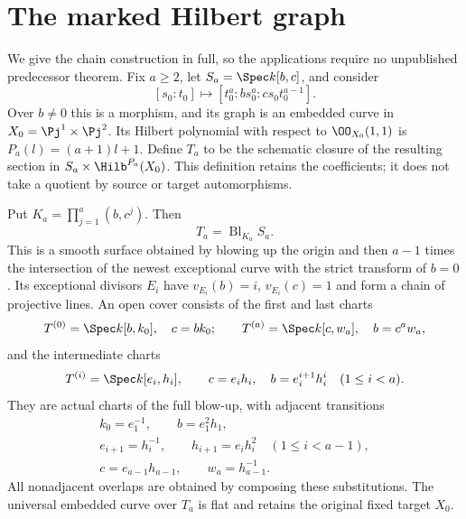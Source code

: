 \section{The marked Hilbert graph}
\label{sec:chain-v171}
We give the chain construction in full, so the applications require no
unpublished predecessor theorem. Fix $a\geq2$, let
$S_a=\Spec k[b,c]$, and consider
\begin{equation}\label{eq:marked-map-v171}
 [s_0:t_0]\longmapsto[t_0^a:b s_0^a:cs_0t_0^{a-1}].
\end{equation}
Over $b\ne0$ this is a morphism, and its graph is an embedded curve in
$X_0=\Pj^1\times\Pj^2$. Its Hilbert polynomial with respect to
$\OO_{X_0}(1,1)$ is $P_a(l)=(a+1)l+1$. Define $T_a$ to be the
schematic closure of the resulting section in
$S_a\times\Hilb^{P_a}(X_0)$. This definition retains the coefficients;
it does not take a quotient by source or target automorphisms.

\begin{theorem}
\label{thm:chain-v171}
Put $K_a=\prod_{j=1}^a(b,c^j)$. Then
\begin{equation}\label{eq:chain-blowup-v171}
 T_a=\operatorname{Bl}_{K_a}S_a.
\end{equation}
This is a smooth surface obtained by blowing up the origin and then
$a-1$ times the intersection of the newest exceptional curve with
the strict transform of $b=0$. Its exceptional divisors $E_i$ have
$v_{E_i}(b)=i$, $v_{E_i}(c)=1$ and form a chain of projective lines.
An open cover consists of the first and last charts
\[
 T^{(0)}=\Spec k[b,k_0],\quad c=bk_0;
 \qquad T^{(a)}=\Spec k[c,w_a],\quad b=c^aw_a,
\]
and the intermediate charts
\begin{equation}\label{eq:chain-charts-v171}
 T^{(i)}=\Spec k[e_i,h_i],\qquad
 c=e_i h_i,\quad b=e_i^{i+1}h_i^i\quad(1\leq i<a).
\end{equation}
They are actual charts of the full blow-up, with adjacent transitions
\begin{equation}\label{eq:chain-overlaps-v171}
 \begin{gathered}
 k_0=e_1^{-1},\qquad b=e_1^2h_1,\\
 e_{i+1}=h_i^{-1},\qquad h_{i+1}=e_i h_i^2\quad(1\leq i<a-1),\\
 c=e_{a-1}h_{a-1},\qquad w_a=h_{a-1}^{-1}.
 \end{gathered}
\end{equation}
All nonadjacent overlaps are obtained by composing these substitutions.
The universal embedded curve over $T_a$ is flat and retains the original
fixed target $X_0$.
\end{theorem}

